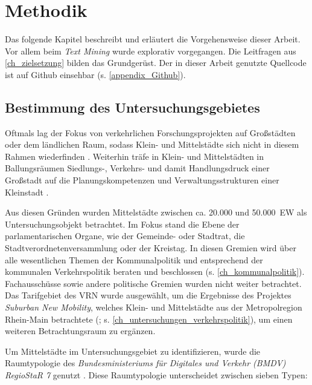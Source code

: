 \chapter{Methodik}\label{ch_methodik}

Das folgende Kapitel beschreibt und erläutert die Vorgehensweise dieser Arbeit. Vor allem beim \textit{Text Mining} wurde explorativ vorgegangen. Die Leitfragen aus \autoref{ch_zielsetzung} bilden das Grundgerüst. Der in dieser Arbeit genutzte Quellcode ist auf Github einsehbar (s. \autoref{appendix_Github}).


\section{Bestimmung des Untersuchungsgebietes}

Oftmals lag der Fokus von verkehrlichen Forschungsprojekten auf Großstädten oder dem ländlichen Raum, sodass Klein- und Mittelstädte sich nicht in diesem Rahmen wiederfinden \parencite[261]{birk2022}. Weiterhin träfe in Klein- und Mittelstädten in Ballungsräumen Siedlungs-, Verkehrs- und damit Handlungsdruck einer Großstadt auf die Planungskompetenzen und Verwaltungsstrukturen einer Kleinstadt \parencite[vgl.][261]{birk2022}.

Aus diesen Gründen wurden Mittelstädte zwischen ca. 20.000 und 50.000~EW als Untersuchungsobjekt betrachtet. Im Fokus stand die Ebene der parlamentarischen Organe, wie der Gemeinde- oder Stadtrat, die Stadtverordnetenversammlung oder der Kreistag. In diesen Gremien wird über alle wesentlichen Themen der Kommunalpolitik und entsprechend der kommunalen Verkehrspolitik beraten und beschlossen (s. \autoref{ch_kommunalpolitik}). Fachausschüsse sowie andere politische Gremien wurden nicht weiter betrachtet. Das Tarifgebiet des VRN \parencite{vrn} wurde ausgewählt, um die Ergebnisse des Projektes \textit{Suburban New Mobility}, welches Klein- und Mittelstädte aus der Metropolregion Rhein-Main betrachtete (\cite[261]{birk2022}; s. \autoref{ch_untersuchungen_verkehrspolitik}), um einen weiteren Betrachtungsraum zu ergänzen.

Um Mittelstädte im Untersuchungsgebiet zu identifizieren, wurde die Raumtypologie des \textit{Bundesministeriums für Digitales und Verkehr (BMDV)} \textit{RegioStaR 7} genutzt \parencite{bmdv2021}. Diese Raumtypologie unterscheidet zwischen sieben Typen:

